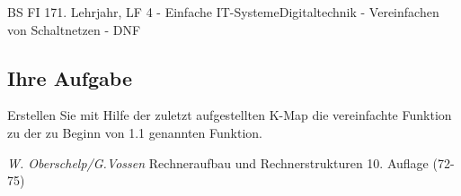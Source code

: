 \documentclass[11pt,twocolumn,oneside,openany,headings=optiontotoc,11pt,numbers=noenddot]{article}
\begin{document}
\begin{worksheet}{BS FI 17}{1. Lehrjahr, LF 4 - Einfache IT-Systeme}{Digitaltechnik - Vereinfachen von Schaltnetzen - DNF}
		\subsection*{Ihre Aufgabe} Erstellen Sie mit Hilfe der zuletzt aufgestellten K-Map die vereinfachte Funktion zu der zu Beginn von 1.1 genannten Funktion.\\
		\par\bigskip\noindent
		\tiny{\color{codegray}\textit{W. Oberschelp/G.Vossen} Rechneraufbau und Rechnerstrukturen 10. Auflage (72-75)}
	\end{worksheet}
\end{document}
